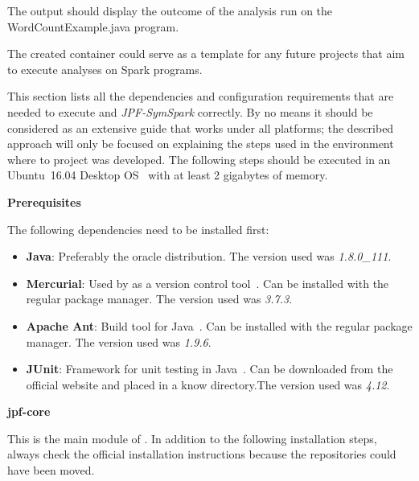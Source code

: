 The output should display the outcome of the analysis run on the WordCountExample.java program.

The created container could serve as a template for any future projects that aim to execute analyses on Spark programs.


This section lists all the dependencies and configuration requirements that are needed to execute \jpf{} and \textit{JPF-SymSpark} correctly. By no means it should be considered as an extensive guide that works under all platforms; the described approach will only be focused on explaining the steps used in the environment where to project was developed. The following steps should be executed in an Ubuntu~16.04 Desktop OS~\cite{WebUbuntu2017} with at least 2 gigabytes of memory.

\textbf{Prerequisites}

The following dependencies need to be installed first:

\begin{itemize}
	\item \textbf{Java}: Preferably the oracle distribution. The version used was \textit{1.8.0\_111}.
	\item \textbf{Mercurial}: Used by \jpf{} as a version control tool~\cite{WebMercurial2017}. Can be installed with the regular package manager. The version used was \textit{3.7.3}.
	\item \textbf{Apache Ant}: Build tool for Java~\cite{WebAnt2017}. Can be installed with the regular package manager. The version used was \textit{1.9.6}.
	\item \textbf{JUnit}: Framework for unit testing in Java~\cite{WebJUnit2017}. Can be downloaded from the official website and placed in a know directory.The version used was \textit{4.12}.
\end{itemize}

\textbf{jpf-core}

This is the main module of \jpf{}. In addition to the following installation steps, always check the official installation instructions because the repositories could have been moved.

